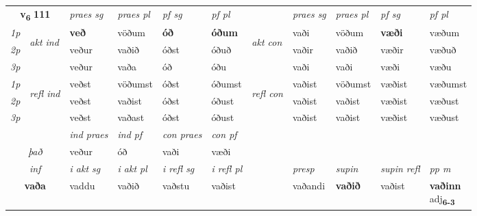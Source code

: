 \noindent
\begin{tabular}{lllllllllll} \toprule
\multicolumn{2}{c}{\textbf{v{\textsubscript{6}}} \Large{\textbf{111}}}  &  \textit{praes sg}  & \textit{praes pl}  &\textit{ pf sg} & \textit{pf pl} &  &  \textit{praes sg}  & \textit{praes pl}  & \textit{pf sg} & \textit{pf pl } \\*
	\cmidrule{3-6} \cmidrule{8-11}
 {\textit{1p}} & \multirow{3}{*}{\begin{turn}{90}\textit{akt ind}\end{turn}} & \textbf{veð} & vöðum & \textbf{óð} & \textbf{óðum} & \multirow{3}{*}{\begin{turn}{90}\textit{akt con}\end{turn}} &vaði & vöðum & \textbf{væði} & væðum\\*
 {\textit{2p}} &  &  veður  & vaðið & óðst & óðuð & & vaðir & vaðið & væðir & væðuð \\*
{\textit{3p}} &  & veður & vaða & óð & óðu & & vaði & vaði& væði & væðu \\*
\cmidrule{3-6} \cmidrule{8-11}
 {\textit{1p}} & \multirow{3}{*}{\begin{turn}{90}\textit{refl ind}\end{turn}}  & veðst & vöðumst & óðst & óðumst & \multirow{3}{*}{\begin{turn}{90}\textit{refl con}\end{turn}}  &vaðist & vöðumst & væðist & væðumst \\*
 {\textit{2p}} &  & veðst & vaðist & óðst & óðust & &vaðist & vaðist & væðist & væðust \\*
 {\textit{3p}}  & & veðst & vaðast & óðst & óðust & & vaðist & vaðist& væðist & væðust \\*
\cmidrule{3-6} \cmidrule{8-11}

   & &  \textit{ind praes} & \textit{ind pf} & \textit{con praes} & \textit{con pf} \\*
\multicolumn{2}{c}{ \textit{það} } & veður & óð & vaði & væði \\*

\cmidrule{3-11}
   \multicolumn{2}{c}{\textit{inf}}  & \textit{i akt sg} & \textit{i akt pl} & \textit{i refl sg} & \textit{i refl pl} && \textit{presp} & \textit{supin} & \textit{supin refl} & \textit{pp m} \\*
  \multicolumn{2}{c}{\textbf{vaða}} & vaddu  & vaðið & vaðstu & vaðist && vaðandi &  \textbf{vaðið} & vaðist & \specialcell{\textbf{vaðinn} \\ adj\textbf{\textsubscript{6-3}}} \\*
\end{tabular}

